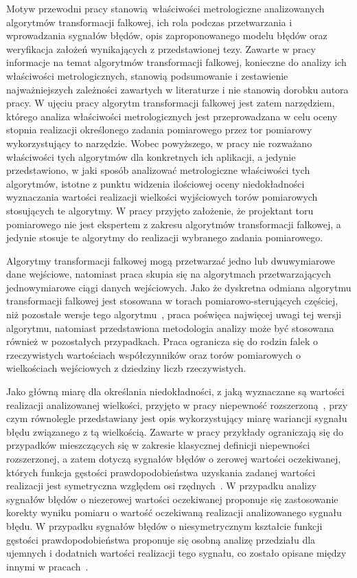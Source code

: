 Motyw przewodni pracy stanowią właściwości metrologiczne analizowanych algorytmów transformacji falkowej, ich rola podczas przetwarzania i wprowadzania sygnałów błędów, opis zaproponowanego modelu błędów oraz weryfikacja założeń wynikających z przedstawionej tezy. Zawarte w pracy informacje na temat algorytmów transformacji falkowej, konieczne do analizy ich właściwości metrologicznych, stanowią podsumowanie i zestawienie najważniejszych zależności zawartych w literaturze i nie stanowią dorobku autora pracy. W ujęciu pracy algorytm transformacji falkowej jest zatem narzędziem, którego analiza właściwości metrologicznych jest przeprowadzana w celu oceny stopnia realizacji określonego zadania pomiarowego przez tor pomiarowy wykorzystujący to narzędzie. Wobec powyższego, w pracy nie rozważano właściwości tych algorytmów dla konkretnych ich aplikacji, a jedynie przedstawiono, w jaki sposób analizować metrologiczne właściwości tych algorytmów, istotne z punktu widzenia ilościowej oceny niedokładności wyznaczania wartości realizacji wielkości wyjściowych torów pomiarowych stosujących te algorytmy. W pracy przyjęto założenie, że projektant toru pomiarowego nie jest ekspertem z zakresu algorytmów transformacji falkowej, a jedynie stosuje te algorytmy do realizacji wybranego zadania pomiarowego.

Algorytmy transformacji falkowej mogą przetwarzać jedno lub dwuwymiarowe dane wejściowe, natomiast praca skupia się na algorytmach przetwarzających jednowymiarowe ciągi danych wejściowych. Jako że dyskretna odmiana algorytmu transformacji falkowej jest stosowana w torach pomiarowo-sterujących częściej, niż pozostałe wersje tego algorytmu~\cite{wallen_handbook, lord_guide, akujuobi_applications}, praca poświęca najwięcej uwagi tej wersji algorytmu, natomiast przedstawiona metodologia analizy może być stosowana również w pozostałych przypadkach. Praca ogranicza się do rodzin falek o rzeczywistych wartościach współczynników oraz torów pomiarowych o wielkościach wejściowych z dziedziny liczb rzeczywistych.

Jako główną miarę dla określania niedokładności, z jaką wyznaczane są wartości realizacji analizowanej wielkości, przyjęto w pracy niepewność rozszerzoną~\cite{jcgm_guide}, przy czym równolegle przedstawiany jest opis wykorzystujący miarę wariancji sygnału błędu związanego z tą wielkością. Zawarte w pracy przykłady ograniczają się do przypadków mieszczących się w zakresie klasycznej definicji niepewności rozszerzonej, a zatem dotyczą sygnałów błędów o zerowej wartości oczekiwanej, których funkcja gęstości prawdopodobieństwa uzyskania zadanej wartości realizacji jest symetryczna względem osi rzędnych~\cite{jcgm_guide}. W przypadku analizy sygnałów błędów o niezerowej wartości oczekiwanej proponuje się zastosowanie korekty wyniku pomiaru o wartość oczekiwaną realizacji analizowanego sygnału błędu. W przypadku sygnałów błędów o niesymetrycznym kształcie funkcji gęstości prawdopodobieństwa proponuje się osobną analizę przedziału dla ujemnych i dodatnich wartości realizacji tego sygnału, co zostało opisane między innymi w pracach~\cite{roj_annuncertainty, wymyslo_range, jakubiec_system}.

